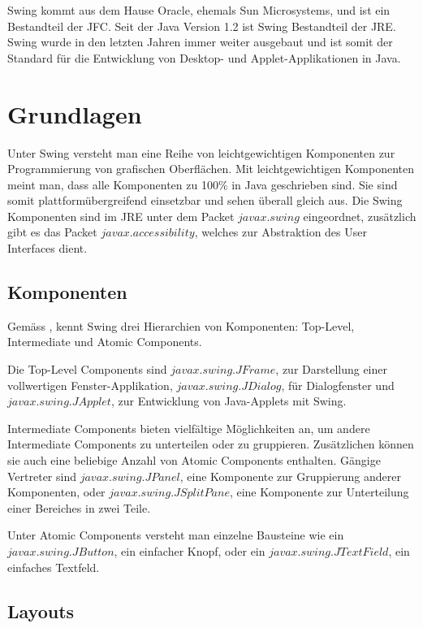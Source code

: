   Swing kommt aus dem Hause Oracle, ehemals Sun Microsystems, und ist ein
  Bestandteil der \ac{JFC}. Seit der Java Version 1.2 ist Swing Bestandteil der
  \ac{JRE}. Swing wurde in den letzten Jahren immer weiter ausgebaut und ist
  somit der Standard für die Entwicklung von Desktop- und Applet-Applikationen
  in Java.
  
  \section{Grundlagen}
  
  Unter Swing versteht man eine Reihe von leichtgewichtigen Komponenten zur
  Programmierung von grafischen Oberflächen. Mit leichtgewichtigen Komponenten
  meint man, dass alle Komponenten zu 100\% in Java geschrieben sind. Sie sind
  somit plattformübergreifend einsetzbar und sehen überall gleich aus. Die Swing
  Komponenten sind im \ac{JRE} unter dem Packet \(javax.swing\) eingeordnet,
  zusätzlich gibt es das Packet \(javax.accessibility\), welches zur
  Abstraktion des User Interfaces dient.
  
  \subsection{Komponenten}
  
  Gemäss \cite{SwingComponentsHighscore}, kennt Swing drei Hierarchien von
  Komponenten: Top-Level, Intermediate und Atomic Components.

  Die Top-Level Components sind \(javax.swing.JFrame\),
  zur Darstellung einer vollwertigen Fenster-Applikation,
  \(javax.swing.JDialog\), für Dialogfenster und \(javax.swing.JApplet\), zur
  Entwicklung von Java-Applets mit Swing.
  
  Intermediate Components bieten vielfältige Möglichkeiten an, um andere
  Intermediate Components zu unterteilen oder zu gruppieren. Zusätzlichen
  können sie auch eine beliebige Anzahl von Atomic Components enthalten. Gängige
  Vertreter sind \(javax.swing.JPanel\), eine Komponente zur Gruppierung anderer
  Komponenten, oder \(javax.swing.JSplitPane\), eine Komponente zur
  Unterteilung einer Bereiches in zwei Teile.
  
  Unter Atomic Components versteht man einzelne Bausteine wie ein
  \(javax.swing.JButton\), ein einfacher Knopf, oder ein
  \(javax.swing.JTextField\), ein einfaches Textfeld.  
  
  \subsection{Layouts}
  
